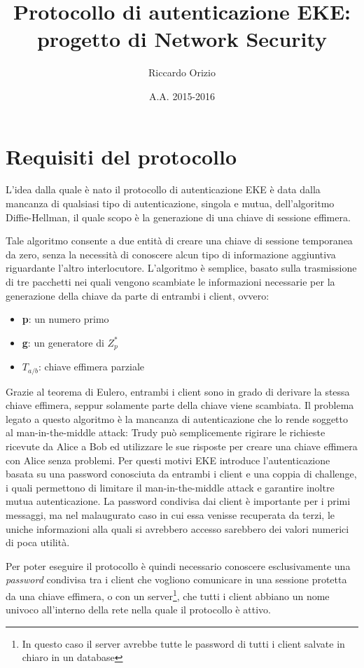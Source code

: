 \documentclass[10pt, letterpaper]{article}
\title{Protocollo di autenticazione EKE:\\ progetto di Network Security}
\author{Riccardo Orizio}
\date{A.A. 2015-2016}
\begin{document}
\maketitle

\section{Requisiti del protocollo}
L'idea dalla quale è nato il protocollo di autenticazione EKE è data dalla
mancanza di qualsiasi tipo di autenticazione, singola e mutua, dell'algoritmo
Diffie-Hellman, il quale scopo è la generazione di una chiave di sessione
effimera.

Tale algoritmo consente a due entità di creare una chiave di sessione temporanea
da zero, senza la necessità di conoscere alcun tipo di informazione aggiuntiva
riguardante l'altro interlocutore.
L'algoritmo è semplice, basato sulla trasmissione di tre pacchetti nei quali
vengono scambiate le informazioni necessarie per la generazione della chiave da
parte di entrambi i client, ovvero:
\begin{itemize}
	\item \textbf{p}: un numero primo
	\item \textbf{g}: un generatore di $Z_p^*$
	\item \textbf{$T_{a/b}$}: chiave effimera parziale
\end{itemize}
Grazie al teorema di Eulero, entrambi i client sono in grado di derivare la
stessa chiave effimera, seppur solamente parte della chiave viene scambiata.
Il problema legato a questo algoritmo è la mancanza di autenticazione che lo
rende soggetto al man-in-the-middle attack: Trudy può semplicemente rigirare le
richieste ricevute da Alice a Bob ed utilizzare le sue risposte per creare una
chiave effimera con Alice senza problemi.
Per questi motivi EKE introduce l'autenticazione basata su una password
conosciuta da entrambi i client e una coppia di challenge, i quali permettono di
limitare il man-in-the-middle attack e garantire inoltre mutua autenticazione.
La password condivisa dai client è importante per i primi messaggi, ma nel
malaugurato caso in cui essa venisse recuperata da terzi, le uniche informazioni
alla quali si avrebbero accesso sarebbero dei valori numerici di poca utilità.

Per poter eseguire il protocollo è quindi necessario conoscere esclusivamente
una \textit{password} condivisa tra i client che vogliono comunicare in una
sessione protetta da una chiave effimera, o con un server\footnote{In questo
caso il server avrebbe tutte le password di tutti i client salvate in chiaro in
un database}, che tutti i client abbiano un nome univoco all'interno della rete
nella quale il protocollo è attivo.
\end{document}

